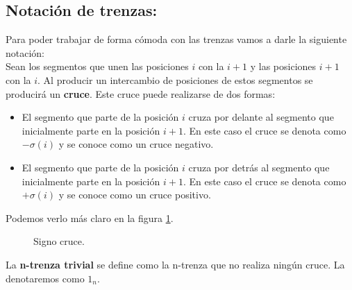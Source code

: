 \newpage
\begin{center}
	\subsection{Notación de trenzas:}
\end{center}
Para poder trabajar de forma cómoda con las trenzas vamos a darle la siguiente notación:\\
Sean los segmentos que unen las posiciones $i$ con la $i+1$ y las posiciones $i+1$ con la $i$. Al producir un intercambio de posiciones de estos segmentos se producirá un \textbf{cruce}. Este cruce puede realizarse de dos formas: 
\begin{itemize}
	\item El segmento que parte de la posición $i$ cruza por delante al segmento que inicialmente parte en la posición $i+1$. En este caso el cruce se denota como $-\sigma(i)$ y se conoce como un cruce negativo.
	\item  El segmento que parte de la posición $i$ cruza por detrás al segmento que inicialmente parte en la posición $i+1$. En este caso el cruce se denota como $+\sigma(i)$ y se conoce como un cruce positivo.
\end{itemize}
Podemos verlo más claro en la figura \ref{tren4}.\\
\begin{figure}[h!]
	\centering
	\space
	\caption{Signo cruce.}
	\label{tren4} 
\end{figure}

La \textbf{n-trenza trivial} se define como la n-trenza que no realiza ningún cruce. La denotaremos como $1_{n}.$ \\

